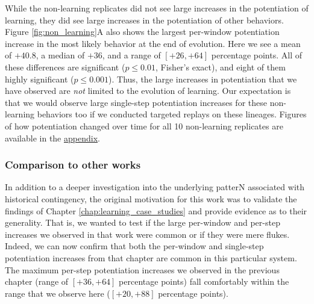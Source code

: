 While the non-learning replicates did not see large increases in the potentiation of learning, they did see large increases in the potentiation of other behaviors. 
Figure \ref{fig:non_learning}A also shows the largest per-window potentiation increase in the most likely behavior at the end of evolution. 
Here we see a mean of $+40.8$, a median of $+36$, and a range of $[+26, +64]$ percentage points.
All of these differences are significant ($p \leq 0.01$, Fisher's exact), and eight of them highly significant ($p \leq 0.001$). 
Thus, the large increases in potentiation that we have observed are \textit{not} limited to the evolution of learning. 
Our expectation is that we would observe large single-step potentiation increases for these non-learning behaviors too if we conducted targeted replays on these lineages.
Figures of how potentiation changed over time for all 10 non-learning replicates are available in the \hyperref[chap:app_a]{appendix}. 

\subsubsection{Comparison to other works}

In addition to a deeper investigation into the underlying patterN associated with historical contingency, the original motivation for this work was to validate the findings of Chapter \ref{chap:learning_case_studies} and provide evidence as to their generality. 
That is, we wanted to test if the large per-window and per-step increases we observed in that work were common or if they were mere flukes. 
Indeed, we can now confirm that both the per-window and single-step potentiation increases from that chapter are common in this particular system. 
The maximum per-step potentiation increases we observed in the previous chapter (range of $[+36, +64]$ percentage points) fall comfortably within the range that we observe here ($[+20, +88]$ percentage points).

